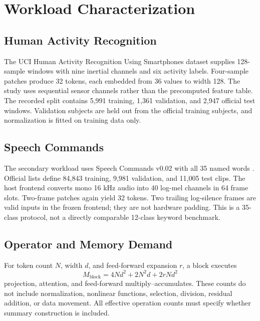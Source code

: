 \section{Workload Characterization}
\label{sec:workloads}
\subsection{Human Activity Recognition}
The UCI Human Activity Recognition Using Smartphones dataset
\cite{uciHAR} supplies 128-sample windows with nine inertial channels and six
activity labels. Four-sample patches produce 32 tokens, each embedded from 36
values to width 128. The study uses sequential sensor channels rather than the
precomputed feature table. The recorded split contains 5,991 training, 1,361
validation, and 2,947 official test windows. Validation subjects are held out
from the official training subjects, and normalization is fitted on training
data only.

\subsection{Speech Commands}
The secondary workload uses Speech Commands v0.02 with all 35 named words
\cite{arxiv180403209}. Official lists define 84,843 training, 9,981 validation,
and 11,005 test clips. The host frontend converts mono 16 kHz audio into 40
log-mel channels in 64 frame slots. Two-frame patches again yield 32 tokens.
Two trailing log-silence frames are valid inputs in the frozen frontend; they
are not hardware padding. This is a 35-class protocol, not a directly
comparable 12-class keyword benchmark.

\subsection{Operator and Memory Demand}
For token count $N$, width $d$, and feed-forward expansion $r$, a block executes
\begin{equation}
  M_{\mathrm{block}} = 4Nd^2 + 2N^2d + 2rNd^2
\end{equation}
projection, attention, and feed-forward multiply--accumulates. These counts do
not include normalization, nonlinear functions, selection, division, residual
addition, or data movement. All effective operation counts must specify
whether summary construction is included.
